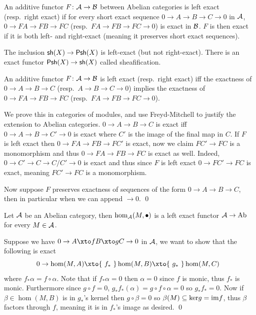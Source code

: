 \bdefn

    An additive functor $F\colon{{\cal A}}\to{{\cal B}}$ between Abelian categories is {\emphcolor left exact} (resp.\ {\emphcolor right exact}) if for every short exact sequence
    $0\to A\to B\to C\to0$ in ${{\cal A}}$, $0\to FA\to FB\to FC$ (resp.\ $FA\to FB\to FC\to0$) is exact in ${{\cal B}}$.
    $F$ is then {\emphcolor exact} if it is both left- and right-exact (meaning it preserves short exact sequences).

\edefn

\bexam

    The inclusion ${\sf sh}(X)\to{\sf Psh}(X)$ is left-exact (but not right-exact).
    There is an exact functor ${\sf Psh}(X)\to{\sf sh}(X)$ called {\emphcolor sheafification}.

\eexam

\bprop

    An additive functor $F\colon{{\cal A}}\to{{\cal B}}$ is left exact (resp.\ right exact) iff the exactness of $0\to A\to B\to C$ (resp.\ $A\to B\to C\to0$) implies the exactness
    of $0\to FA\to FB\to FC$ (resp.\ $FA\to FB\to FC\to0$).

\eprop

\bproof

    We prove this in categories of modules, and use Freyd-Mitchell to justify the extension to Abelian categories.
    $0\to A\to B\to C$ is exact iff $0\to A\to B\to C'\to0$ is exact where $C'$ is the image of the final map in $C$.
    If $F$ is left exact then $0\to FA\to FB\to FC'$ is exact, now we claim $FC'\to FC$ is a monomorphism and thus $0\to FA\to FB\to FC$ is exact as well.
    Indeed, $0\to C'\to C\to C/C'\to 0$ is exact and thus since $F$ is left exact $0\to FC'\to FC$ is exact, meaning $FC'\to FC$ is a monomorphism.

    Now suppose $F$ preserves exactness of sequences of the form $0\to A\to B\to C$, then in particular when we can append $\to0$.
    \qed

\eproof

\bprop

    Let ${{\cal A}}$ be an Abelian category, then $\hom_{{\cal A}}(M,\bullet)$ is a left exact functor ${{\cal A}}\to{\rm Ab}$ for every $M\in{{\cal A}}$.

\eprop

\bproof

    Suppose we have $0\to A\xto fB\xto gC\to0$ in ${{\cal A}}$, we want to show that the following is exact
    $$ 0 \to \hom(M,A) \xto{\ f_*\ } \hom(M,B) \xto{\ g_*\ } \hom(M,C) $$
    where $f_*\alpha=f\circ\alpha$.
    Note that if $f_*\alpha=0$ then $\alpha=0$ since $f$ is monic, thus $f_*$ is monic.
    Furthermore since $g\circ f=0$, $g_*f_*(\alpha)=g\circ f\circ\alpha=0$ so $g_*f_*=0$.
    Now if $\beta\in\hom(M,B)$ is in $g_*$'s kernel then $g\circ\beta=0$ so $\beta(M)\subseteq{\rm ker} g={\rm im} f$, thus $\beta$ factors through $f$, meaning it is in $f_*$'s image as desired.
    \qed

